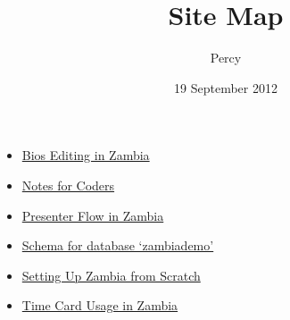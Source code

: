 \documentclass{article}
\title{Site Map}
\author{Percy}
\date{19 September 2012}
\begin{document}
\maketitle


\begin{itemize}
\item \href{Bio_Editing.org}{Bios Editing in Zambia}
\item \href{NotesForCoders.org}{Notes for Coders}
\item \href{Source/Presenter_Flow.org}{Presenter Flow in Zambia}
\item \href{schema.org}{Schema for database `zambiademo'}
\item \href{Setting_Up.org}{Setting Up Zambia from Scratch}
\item \href{Time_Card.org}{Time Card Usage in Zambia}
\end{itemize}
\end{document}
